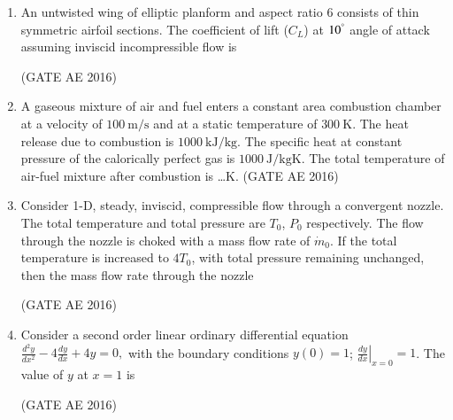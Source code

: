 \documentclass[journal,12pt,onecolumn]{IEEEtran}
\theoremstyle{remark}
\begin{document}
\begin{enumerate}
\item An untwisted wing of elliptic planform and aspect ratio $6$ consists of thin symmetric airfoil sections. The coefficient of lift ($C_L$) at $10^{\degree}$ angle of attack assuming inviscid incompressible flow is
\begin{enumerate}
\end{enumerate}
\hfill(GATE AE 2016)



\item A gaseous mixture of air and fuel enters a constant area combustion chamber at a velocity of $100~\mathrm{m/s}$ and at a static temperature of $300~\mathrm{K}$. The heat release due to combustion is $1000~\mathrm{kJ/kg}$. The specific heat at constant pressure of the calorically perfect gas is $1000~\mathrm{J/kgK}$. The total temperature of air-fuel mixture after combustion is \dots K.
\hfill(GATE AE 2016)



\item Consider 1-D, steady, inviscid, compressible flow through a convergent nozzle. The total temperature and total pressure are $T_0$, $P_0$ respectively. The flow through the nozzle is choked with a mass flow rate of $\dot{m}_0$. If the total temperature is increased to $4T_0$, with total pressure remaining unchanged, then the mass flow rate through the nozzle
\begin{enumerate}
\end{enumerate}
\hfill(GATE AE 2016)



\item Consider a second order linear ordinary differential equation 
$
\frac{d^2 y}{dx^2} - 4 \frac{dy}{dx} + 4y = 0,
$
with the boundary conditions $y(0) = 1$; $\left.\frac{dy}{dx}\right|_{x=0} = 1$. The value of $y$ at $x=1$ is
\begin{enumerate}
\end{enumerate}
\hfill(GATE AE 2016)




\end{enumerate}
\end{document}
